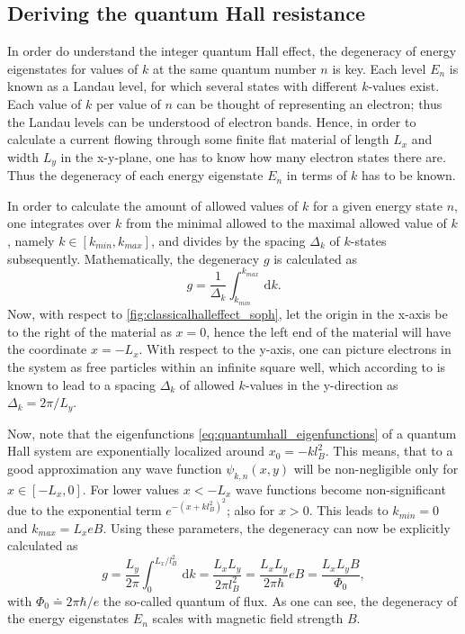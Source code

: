 \documentclass{report}
\numberwithin{tm}{section}
\begin{document}

\subsection{Deriving the quantum Hall resistance}
In order do understand the integer quantum Hall effect, the degeneracy of energy eigenstates for values of $k$ at the same quantum number $n$ is key. Each level $E_n$ is known as a Landau level, for which several states with different $k$-values exist. Each value of $k$ per value of $n$ can be thought of representing an electron; thus the Landau levels can be understood of electron bands. Hence, in order to calculate a current flowing through some finite flat material of length $L_x$ and width $L_y$ in the x-y-plane, one has to know how many electron states there are. Thus the degeneracy of each energy eigenstate $E_n$ in terms of $k$ has to be known. %

In order to calculate the amount of allowed values of $k$ for a given energy state $n$, one integrates over $k$ from the minimal allowed to the maximal allowed value of $k$, namely $ k \in [k_{min},k_{max}]$, and divides by the spacing $\Delta_k$ of $k$-states subsequently. Mathematically, the degeneracy $g$ is calculated as \begin{equation}
	g = \frac{1}{\Delta_k}\int_{k_{min}}^{k_{max}}\,\mathrm{d}k.
\end{equation} Now, with respect to \cref{fig:classicalhalleffect_soph}, let the origin in the x-axis be to the right of the material as $x=0$, hence the left end of the material will have the coordinate $x=-L_x$. With respect to the y-axis, one can picture electrons in the system as free particles within an infinite square well, which according to \cite[p.32]{Griffiths.2018} is known to lead to a spacing $\Delta_k$ of allowed $k$-values in the y-direction as $\Delta_k = 2\pi/L_y$.

Now, note that the eigenfunctions \cref{eq:quantumhall_eigenfunctions} of a quantum Hall system are exponentially localized around $x_0 = -kl_B^2$. This means, that to a good approximation any wave function $\psi_{k,n}(x,y)$ will be non-negligible only for $x \in [-L_x,0]$. For lower values $x < -L_x$ wave functions become non-significant due to the exponential term $e^{-(x+kl_B^2)^2}$; also for $x > 0$. This leads to $k_{min} = 0$ and $k_{max} = L_x e B$. Using these parameters, the degeneracy can now be explicitly calculated as \begin{equation}\label{eq:degeneracy_qhe}
	g = \frac{L_y}{2\pi}\int_{0}^{L_x/l_B^2}\,\mathrm{d}k = \frac{L_xL_y}{2\pi l_B^2} = \frac{L_x L_y}{2\pi \hbar}eB = \frac{L_xL_yB}{\Phi_0},
\end{equation} with $\Phi_0 \doteq 2\pi\hbar/e$ the so-called quantum of flux. As one can see, the degeneracy of the energy eigenstates $E_n$ scales with magnetic field strength $B$.
\end{document}
